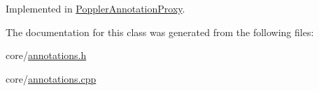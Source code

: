 Implemented in \hyperlink{classPopplerAnnotationProxy_a1c76a27f5bdcae079ac6cc389d790a4a}{Poppler\+Annotation\+Proxy}.



The documentation for this class was generated from the following files\+:\begin{DoxyCompactItemize}
\item 
core/\hyperlink{annotations_8h}{annotations.\+h}\item 
core/\hyperlink{annotations_8cpp}{annotations.\+cpp}\end{DoxyCompactItemize}
